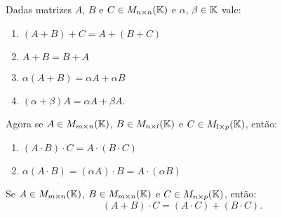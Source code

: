 \begin{proposicao}
	Dadas matrizes $A$, $B$ e $C \in M_{n\times n}(\mathbb{K})$ e $\alpha$, $\beta \in \mathbb{K}$ vale:
	\begin{enumerate}[label={\roman*})]
		\item $(A + B) + C = A + (B + C)$
		\item $A + B = B + A$
		\item $\alpha(A + B) = \alpha A + \alpha B$
		\item $(\alpha + \beta)A = \alpha A + \beta A$.
	\end{enumerate}
	Agora se $A \in M_{m\times n}(\mathbb{K})$, $B \in M_{n\times l}(\mathbb{K})$ e $C \in M_{l\times p}(\mathbb{K})$, ent\~ao:
	\begin{enumerate}[label={\roman*})]
		\item $(A\cdot B)\cdot C = A\cdot(B \cdot C)$
		\item $\alpha(A\cdot B) = (\alpha A)\cdot B = A \cdot(\alpha B)$
	\end{enumerate}
	Se $A \in M_{m\times n}(\mathbb{K})$, $B \in M_{m\times n}(\mathbb{K})$ e $C \in M_{n\times p}(\mathbb{K})$, ent\~ao:
	\[
		(A + B)\cdot C = (A\cdot C) + (B\cdot C).
	\]
\end{proposicao}
